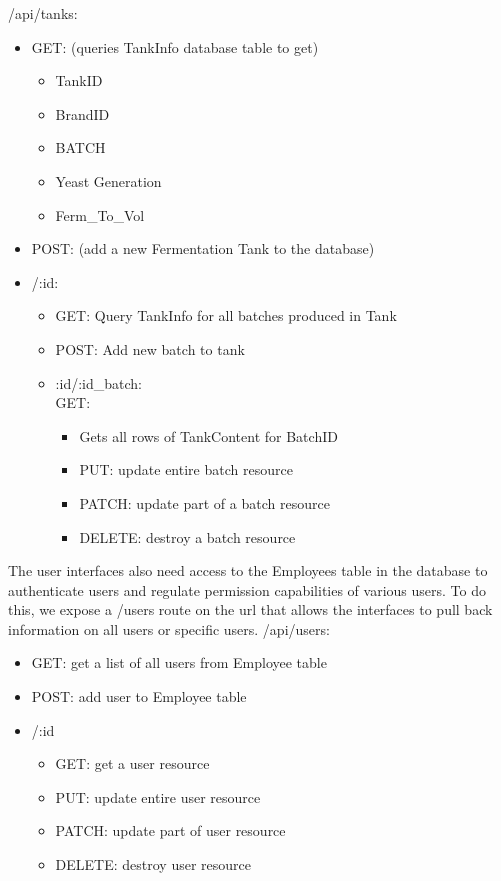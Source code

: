 \documentclass[draftclsnofoot,onecolumn,letterpaper,10pt]{IEEEtran}
\begin{document}
		/api/tanks:
		\begin{itemize}
			\item GET: (queries TankInfo database table to get)
			\begin{itemize}
				\item TankID
				\item BrandID
				\item BATCH
				\item Yeast Generation
				\item Ferm\_To\_Vol
			\end{itemize}
			\item POST: (add a new Fermentation Tank to the database)
			\item /:id:
			\begin{itemize}
				\item GET: Query TankInfo for all batches produced in Tank
				\item POST: Add new batch to tank
				\item :id/:id\_batch: \\
					GET:
					\begin{itemize}
						\item Gets all rows of TankContent for BatchID
						\item PUT: update entire batch resource
						\item PATCH: update part of a batch resource
						\item DELETE: destroy a batch resource
					\end{itemize}
				\end{itemize}
		\end{itemize}


		The user interfaces also need access to the Employees table in the database to authenticate users and regulate permission capabilities of various users.
		To do this, we expose a /users route on the url that allows the interfaces to pull back information on all users or specific users.
		/api/users:
		\begin{itemize}
			\item GET: get a list of all users from Employee table
			\item POST: add user to Employee table

			\item /:id
			\begin{itemize}
				\item GET: get a user resource
				\item PUT: update entire user resource
				\item PATCH: update part of user resource
				\item DELETE: destroy user resource
			\end{itemize}
		\end{itemize}
\end{document}
